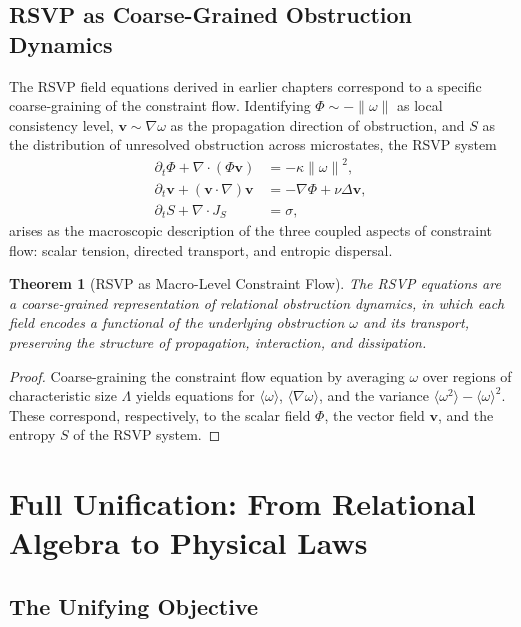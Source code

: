 \documentclass[12pt,a4paper,openany]{book}
\theoremstyle{plain}
\newtheorem{theorem}{Theorem}[chapter]
\theoremstyle{definition}
\theoremstyle{remark}
\newcommand{\norm}[1]{\left\|#1\right\|}
\begin{document}
\subsection{RSVP as Coarse-Grained Obstruction Dynamics}

The RSVP field equations derived in earlier chapters correspond to a specific coarse-graining of the constraint flow. Identifying $\Phi \sim -\norm{\omega}$ as local consistency level, $\mathbf{v} \sim \nabla\omega$ as the propagation direction of obstruction, and $S$ as the distribution of unresolved obstruction across microstates, the RSVP system
\begin{align*}
\partial_t\Phi + \nabla\cdot(\Phi\mathbf{v}) &= -\kappa\norm{\omega}^2, \\
\partial_t\mathbf{v} + (\mathbf{v}\cdot\nabla)\mathbf{v} &= -\nabla\Phi + \nu\Delta\mathbf{v}, \\
\partial_t S + \nabla\cdot J_S &= \sigma,
\end{align*}
arises as the macroscopic description of the three coupled aspects of constraint flow: scalar tension, directed transport, and entropic dispersal.

\begin{theorem}[RSVP as Macro-Level Constraint Flow]
The RSVP equations are a coarse-grained representation of relational obstruction dynamics, in which each field encodes a functional of the underlying obstruction $\omega$ and its transport, preserving the structure of propagation, interaction, and dissipation.
\end{theorem}

\begin{proof}
Coarse-graining the constraint flow equation by averaging $\omega$ over regions of characteristic size $\Lambda$ yields equations for $\langle\omega\rangle$, $\langle\nabla\omega\rangle$, and the variance $\langle\omega^2\rangle - \langle\omega\rangle^2$. These correspond, respectively, to the scalar field $\Phi$, the vector field $\mathbf{v}$, and the entropy $S$ of the RSVP system.
\end{proof}

\section{Full Unification: From Relational Algebra to Physical Laws}
\label{sec:full_unification}

\subsection{The Unifying Objective}
\end{document}
